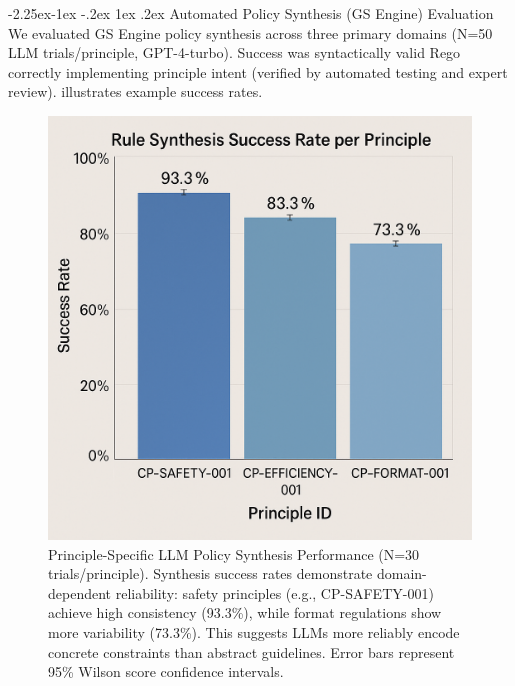 \documentclass[manuscript,screen,9pt]{acmart}
\makeatletter
\renewcommand\subsection{\@startsection{subsection}{2}{\z@}%
  {-2.25ex\@plus -1ex \@minus -.2ex}%
  {1ex \@plus .2ex}%
  {\normalfont\large\bfseries}}
\makeatother
\begin{document}
\subsection{Automated Policy Synthesis (GS Engine) Evaluation}
\label{sec:synthesis_evaluation}
We evaluated GS Engine policy synthesis across three primary domains (N=50 LLM trials/principle, GPT-4-turbo). Success was syntactically valid Rego correctly implementing principle intent (verified by automated testing and expert review).  illustrates example success rates.

\FloatBarrier %
\begin{figure}[!htb]
\centering
\includegraphics[width=\linewidth,keepaspectratio]{figs/Figure_3_Rule_Synthesis_Success_Rate_per_Principle.png}
\caption[Principle-Specific LLM Policy Synthesis Performance]{Principle-Specific LLM Policy Synthesis Performance (N=30 trials/principle). Synthesis success rates demonstrate domain-dependent reliability: safety principles (e.g., CP-SAFETY-001) achieve high consistency (93.3\%), while format regulations show more variability (73.3\%). This suggests LLMs more reliably encode concrete constraints than abstract guidelines. Error bars represent 95\% Wilson score confidence intervals.}
\label{fig:rule_synthesis_chart}
\end{figure}
\end{document}
